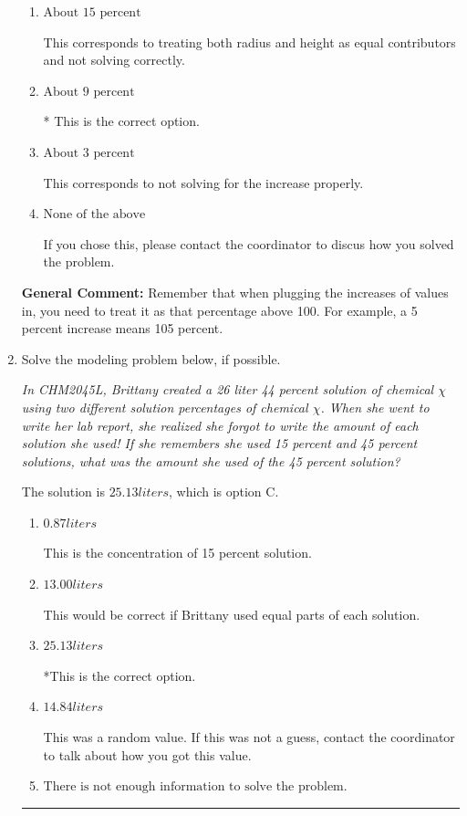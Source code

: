 \documentclass{extbook}[14pt]
\newcommand{\litem}[1]{\item #1

\rule{\textwidth}{0.4pt}}
\begin{document}
\begin{enumerate}
{\begin{enumerate}[label=\Alph*.]
This corresponds to solving correctly but treating both radius and height as equal contributors to the volume.
\item \( \text{About } 15 \text{ percent} \)

This corresponds to treating both radius and height as equal contributors and not solving correctly.
\item \( \text{About } 9 \text{ percent} \)

* This is the correct option.
\item \( \text{About } 3 \text{ percent} \)

This corresponds to not solving for the increase properly.
\item \( \text{None of the above} \)

If you chose this, please contact the coordinator to discus how you solved the problem.
\end{enumerate}

\textbf{General Comment:} Remember that when plugging the increases of values in, you need to treat it as that percentage above 100. For example, a 5 percent increase means 105 percent.
}
\litem{
Solve the modeling problem below, if possible.

\begin{center}
    \textit{ In CHM2045L, Brittany created a 26 liter 44 percent solution of chemical $\chi$ using two different solution percentages of chemical $\chi$. When she went to write her lab report, she realized she forgot to write the amount of each solution she used! If she remembers she used 15 percent and 45 percent solutions, what was the amount she used of the 45 percent solution? }
\end{center}
The solution is \( 25.13 liters \), which is option C.\begin{enumerate}[label=\Alph*.]
\item \( 0.87 liters \)

This is the concentration of 15 percent solution.
\item \( 13.00 liters \)

This would be correct if Brittany used equal parts of each solution.
\item \( 25.13 liters \)

*This is the correct option.
\item \( 14.84 liters \)

This was a random value. If this was not a guess, contact the coordinator to talk about how you got this value.
\item \( \text{There is not enough information to solve the problem.} \)


\end{enumerate}}
\end{enumerate}
\end{document}
